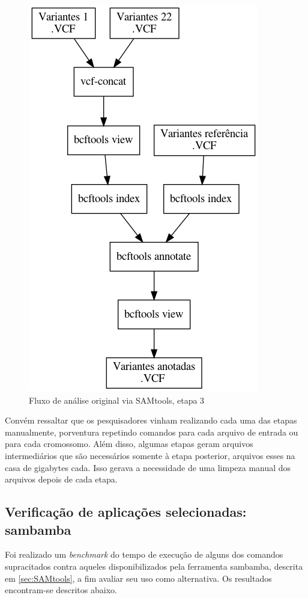\documentclass[cic,tc]{iiufrgs}
\begin{document}
\begin{figure}
  \caption{Fluxo de análise original via SAMtools, etapa 3}
    \begin{center}
      \includegraphics[width=0.65\linewidth]{img/stage3_orig.png}
    \end{center}
    \label{fig:stage3_orig}
\end{figure}

Convém ressaltar que os pesquisadores vinham realizando cada uma das etapas
manualmente, porventura repetindo comandos para cada arquivo de entrada ou para
cada cromossomo. Além disso, algumas etapas geram arquivos intermediários que
são necessários somente à etapa posterior, arquivos esses na casa de gigabytes
cada. Isso gerava a necessidade de uma limpeza manual dos arquivos depois de
cada etapa.

\subsection{Verificação de aplicações selecionadas: sambamba}

Foi realizado um \textit{benchmark} do tempo de execução de alguns dos comandos
supracitados contra aqueles disponibilizados pela ferramenta sambamba, descrita
em \ref{sec:SAMtools}, a fim avaliar seu uso como alternativa. Os resultados
encontram-se descritos abaixo.
\end{document}
